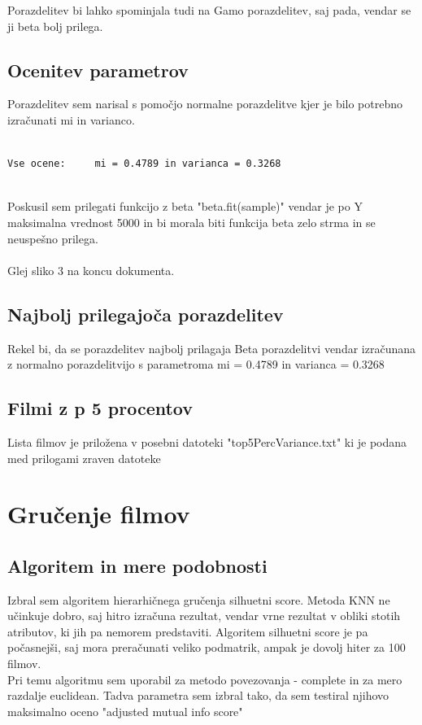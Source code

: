\documentclass[a4paper,11pt]{article}
\begin{document}
		Porazdelitev bi lahko spominjala tudi na Gamo porazdelitev, saj pada, vendar se ji beta bolj prilega.
	\subsection{Ocenitev parametrov}
		Porazdelitev sem narisal s pomočjo normalne porazdelitve kjer je bilo potrebno izračunati mi in varianco.
		\begin{lstlisting}

Vse ocene:     mi = 0.4789 in varianca = 0.3268
	
		\end{lstlisting}
		
		Poskusil sem prilegati funkcijo z beta "beta.fit(sample)" vendar je po Y maksimalna vrednost 5000 in bi morala biti funkcija beta zelo strma in se neuspešno prilega.\\\\
		Glej sliko 3 na koncu dokumenta.
		
	
		

	\subsection{Najbolj prilegajoča porazdelitev}
		Rekel bi, da se porazdelitev najbolj prilagaja Beta porazdelitvi vendar izračunana z normalno porazdelitvijo s parametroma mi = 0.4789 in varianca = 0.3268

		
	\subsection{Filmi z p 5 procentov}
		Lista filmov je priložena v posebni datoteki "top5PercVariance.txt" ki je podana med prilogami zraven datoteke
	
	
	\section{Gručenje filmov}

	\subsection{Algoritem in mere podobnosti}
		Izbral sem algoritem hierarhičnega gručenja silhuetni score. Metoda KNN ne učinkuje dobro, saj hitro izračuna rezultat, vendar vrne rezultat v obliki stotih atributov, ki jih pa nemorem predstaviti.
		Algoritem silhuetni score je pa počasnejši, saj mora preračunati veliko podmatrik, ampak je dovolj hiter za 100 filmov.\\
		Pri temu algoritmu sem uporabil za metodo povezovanja - complete in za mero razdalje euclidean. Tadva parametra sem izbral tako, da sem testiral njihovo maksimalno oceno "adjusted mutual info score"
		
\end{document}
